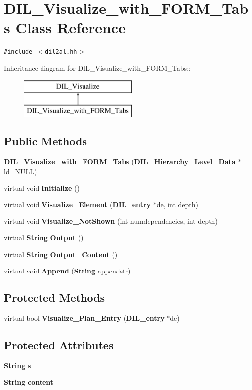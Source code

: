 \section{DIL\_\-Visualize\_\-with\_\-FORM\_\-Tabs  Class Reference}
\label{classDIL__Visualize__with__FORM__Tabs}
{\tt \#include $<$dil2al.hh$>$}

Inheritance diagram for DIL\_\-Visualize\_\-with\_\-FORM\_\-Tabs::\begin{figure}[H]
\begin{center}
\leavevmode
\includegraphics[height=2cm]{classDIL__Visualize__with__FORM__Tabs}
\end{center}
\end{figure}
\subsection*{Public Methods}
\begin{CompactItemize}
\item 
{\bf DIL\_\-Visualize\_\-with\_\-FORM\_\-Tabs} ({\bf DIL\_\-Hierarchy\_\-Level\_\-Data} $\ast$ld=NULL)
\item 
virtual void {\bf Initialize} ()
\item 
virtual void {\bf Visualize\_\-Element} ({\bf DIL\_\-entry} $\ast$de, int depth)
\item 
virtual void {\bf Visualize\_\-Not\-Shown} (int numdependencies, int depth)
\item 
virtual {\bf String} {\bf Output} ()
\item 
virtual {\bf String} {\bf Output\_\-Content} ()
\item 
virtual void {\bf Append} ({\bf String} appendstr)
\end{CompactItemize}
\subsection*{Protected Methods}
\begin{CompactItemize}
\item 
virtual bool {\bf Visualize\_\-Plan\_\-Entry} ({\bf DIL\_\-entry} $\ast$de)
\end{CompactItemize}
\subsection*{Protected Attributes}
\begin{CompactItemize}
\item 
{\bf String} {\bf s}
\item 
{\bf String} {\bf content}
\end{CompactItemize}


